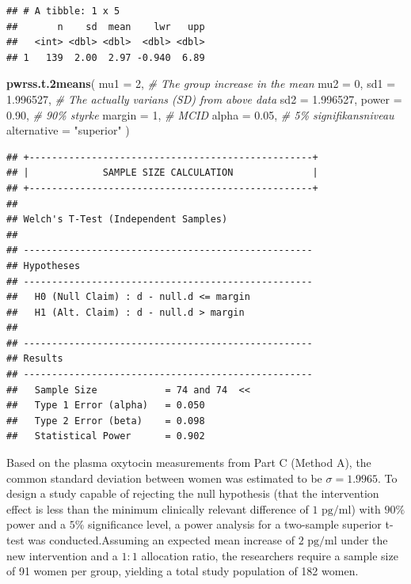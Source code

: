 \documentclass[
]{article}
\newenvironment{Shaded}{\begin{snugshade}}{\end{snugshade}}
\newcommand{\AttributeTok}[1]{\textcolor[rgb]{0.13,0.29,0.53}{#1}}
\newcommand{\CommentTok}[1]{\textcolor[rgb]{0.56,0.35,0.01}{\textit{#1}}}
\newcommand{\DecValTok}[1]{\textcolor[rgb]{0.00,0.00,0.81}{#1}}
\newcommand{\FloatTok}[1]{\textcolor[rgb]{0.00,0.00,0.81}{#1}}
\newcommand{\FunctionTok}[1]{\textcolor[rgb]{0.13,0.29,0.53}{\textbf{#1}}}
\newcommand{\NormalTok}[1]{#1}
\newcommand{\StringTok}[1]{\textcolor[rgb]{0.31,0.60,0.02}{#1}}
\begin{document}
\begin{verbatim}
## # A tibble: 1 x 5
##       n    sd  mean    lwr   upp
##   <int> <dbl> <dbl>  <dbl> <dbl>
## 1   139  2.00  2.97 -0.940  6.89
\end{verbatim}

\begin{Shaded}
\begin{Highlighting}[]
\FunctionTok{pwrss.t.2means}\NormalTok{(}
  \AttributeTok{mu1 =} \DecValTok{2}\NormalTok{,           }\CommentTok{\# The group increase in the mean}
  \AttributeTok{mu2 =} \DecValTok{0}\NormalTok{,           }
  \AttributeTok{sd1 =} \FloatTok{1.996527}\NormalTok{,    }\CommentTok{\# The actually varians (SD) from above data}
  \AttributeTok{sd2 =} \FloatTok{1.996527}\NormalTok{,    }
  \AttributeTok{power =} \FloatTok{0.90}\NormalTok{,      }\CommentTok{\# 90\% styrke}
  \AttributeTok{margin =} \DecValTok{1}\NormalTok{,        }\CommentTok{\# MCID}
  \AttributeTok{alpha =} \FloatTok{0.05}\NormalTok{,      }\CommentTok{\# 5\% signifikansniveau}
  \AttributeTok{alternative =} \StringTok{"superior"}
\NormalTok{)}
\end{Highlighting}
\end{Shaded}

\begin{verbatim}
## +--------------------------------------------------+
## |             SAMPLE SIZE CALCULATION              |
## +--------------------------------------------------+
## 
## Welch's T-Test (Independent Samples)
## 
## ---------------------------------------------------
## Hypotheses
## ---------------------------------------------------
##   H0 (Null Claim) : d - null.d <= margin 
##   H1 (Alt. Claim) : d - null.d > margin 
## 
## ---------------------------------------------------
## Results
## ---------------------------------------------------
##   Sample Size            = 74 and 74  <<
##   Type 1 Error (alpha)   = 0.050
##   Type 2 Error (beta)    = 0.098
##   Statistical Power      = 0.902
\end{verbatim}

Based on the plasma oxytocin measurements from Part C (Method A), the
common standard deviation between women was estimated to be
\(\sigma = 1.9965\). To design a study capable of rejecting the null
hypothesis (that the intervention effect is less than the minimum
clinically relevant difference of \(1\text{ pg/ml}\)) with \(90\%\)
power and a \(5\%\) significance level, a power analysis for a
two-sample superior t-test was conducted.Assuming an expected mean
increase of \(2\text{ pg/ml}\) under the new intervention and a \(1:1\)
allocation ratio, the researchers require a sample size of 91 women per
group, yielding a total study population of 182 women.
\end{document}
